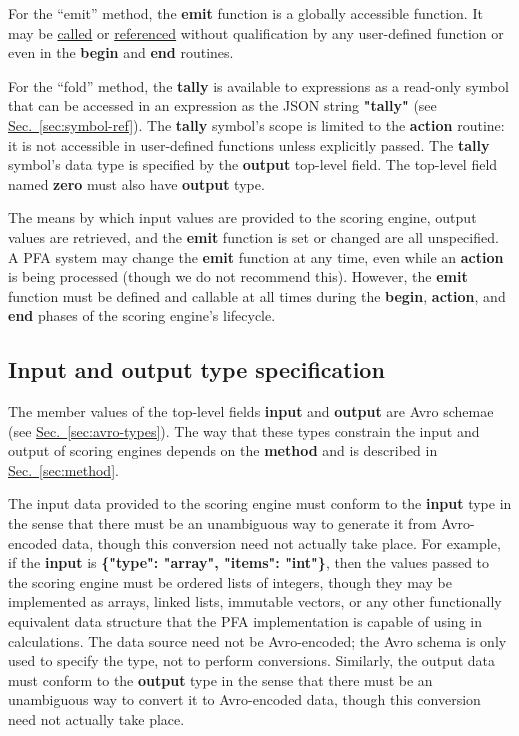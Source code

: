 \documentclass{article}
\newcommand{\PFAc}{\ttfamily\bfseries}
\theoremstyle{definition}
\begin{document}
For the ``emit'' method, the {\PFAc emit} function is a globally accessible function.  It may be \hyperlink{hsec:function-call}{called} or \hyperlink{hsec:fcnref}{referenced} without qualification by any user-defined function or even in the {\PFAc begin} and {\PFAc end} routines.

For the ``fold'' method, the {\PFAc tally} is available to expressions as a read-only symbol that can be accessed in an expression as the JSON string {\PFAc "tally"} (see \hyperlink{hsec:symbol-ref}{Sec.~\ref{sec:symbol-ref}}).  The {\PFAc tally} symbol's scope is limited to the {\PFAc action} routine: it is not accessible in user-defined functions unless explicitly passed.  The {\PFAc tally} symbol's data type is specified by the {\PFAc output} top-level field.  The top-level field named {\PFAc zero} must also have {\PFAc output} type.

The means by which input values are provided to the scoring engine, output values are retrieved, and the {\PFAc emit} function is set or changed are all unspecified.  A PFA system may change the {\PFAc emit} function at any time, even while an {\PFAc action} is being processed (though we do not recommend this).  However, the {\PFAc emit} function must be defined and callable at all times during the {\PFAc begin}, {\PFAc action}, and {\PFAc end} phases of the scoring engine's lifecycle.

\hypertarget{hsec:input-output}{}
\subsection{Input and output type specification}
\label{sec:input-output}

The member values of the top-level fields {\PFAc input} and {\PFAc output} are Avro schemae (see \hyperlink{hsec:avro-types}{Sec.~\ref{sec:avro-types}}).  The way that these types constrain the input and output of scoring engines depends on the {\PFAc method} and is described in \hyperlink{hsec:method}{Sec.~\ref{sec:method}}.

The input data provided to the scoring engine must conform to the {\PFAc input} type in the sense that there must be an unambiguous way to generate it from Avro-encoded data, though this conversion need not actually take place.  For example, if the {\PFAc input} is {\PFAc \{"type":$\!$ "array", "items":$\!$ "int"\}}, then the values passed to the scoring engine must be ordered lists of integers, though they may be implemented as arrays, linked lists, immutable vectors, or any other functionally equivalent data structure that the PFA implementation is capable of using in calculations.  The data source need not be Avro-encoded; the Avro schema is only used to specify the type, not to perform conversions.  Similarly, the output data must conform to the {\PFAc output} type in the sense that there must be an unambiguous way to convert it to Avro-encoded data, though this conversion need not actually take place.
\end{document}
